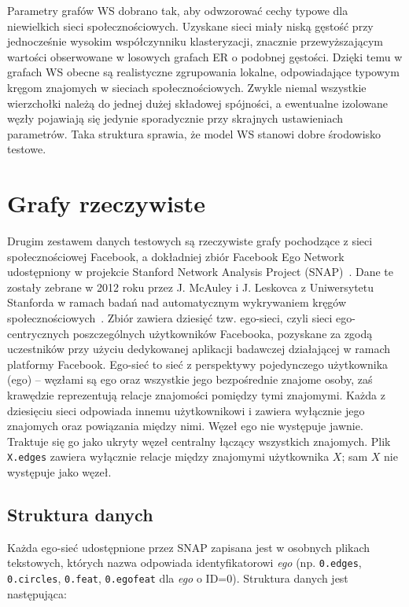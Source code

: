 Parametry grafów WS dobrano tak, aby odwzorować cechy typowe dla niewielkich sieci społecznościowych. Uzyskane sieci miały niską gęstość przy jednocześnie wysokim współczynniku klasteryzacji, znacznie przewyższającym wartości obserwowane w losowych grafach ER o podobnej gęstości. Dzięki temu w grafach WS obecne są realistyczne zgrupowania lokalne, odpowiadające typowym kręgom znajomych w sieciach społecznościowych. Zwykle niemal wszystkie wierzchołki należą do jednej dużej składowej spójności, a ewentualne izolowane węzły pojawiają się jedynie sporadycznie przy skrajnych ustawieniach parametrów. Taka struktura sprawia, że model WS stanowi dobre środowisko testowe.

\section{Grafy rzeczywiste}
Drugim zestawem danych testowych są rzeczywiste grafy pochodzące z sieci społecznościowej Facebook,
a dokładniej zbiór Facebook Ego Network udostępniony w projekcie Stanford Network Analysis Project (SNAP)~\cite{snapnets}.
Dane te zostały zebrane w 2012 roku przez J. McAuley i J. Leskovca z Uniwersytetu Stanforda w ramach badań nad automatycznym wykrywaniem kręgów społecznościowych~\cite{McAuley2012}. Zbiór zawiera dziesięć tzw. ego-sieci, czyli sieci ego-centrycznych poszczególnych użytkowników Facebooka, pozyskane za zgodą uczestników przy użyciu dedykowanej aplikacji badawczej działającej w ramach platformy Facebook. Ego-sieć to sieć z perspektywy pojedynczego użytkownika (ego) -- węzłami są ego oraz wszystkie jego bezpośrednie znajome osoby, zaś krawędzie reprezentują relacje znajomości pomiędzy tymi znajomymi. Każda z dziesięciu sieci odpowiada innemu użytkownikowi i zawiera wyłącznie jego znajomych oraz powiązania między nimi. Węzeł ego nie występuje jawnie. Traktuje się go jako ukryty węzeł centralny łączący wszystkich znajomych. Plik \verb|X.edges| zawiera wyłącznie relacje między znajomymi użytkownika $X$; sam $X$ nie występuje jako węzeł.

\subsection{Struktura danych}

Każda ego-sieć udostępnione przez SNAP zapisana jest w osobnych plikach tekstowych, których nazwa odpowiada identyfikatorowi \textit{ego} (np. \verb|0.edges|, \verb|0.circles|, \verb|0.feat|, \verb|0.egofeat| dla \textit{ego} o ID=0). Struktura danych jest następująca:

